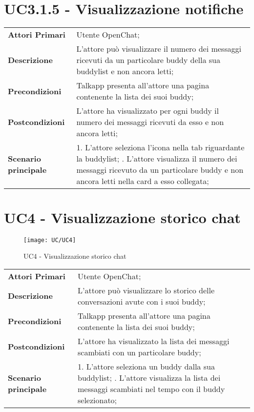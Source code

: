\section{UC3.1.5 - Visualizzazione notifiche}
	\begin{center}
		\bgroup
		\def\arraystretch{1.8}     
		\begin{longtable}{  p{4cm} | p{9.5cm} } 
			\textbf{Attori Primari} & Utente OpenChat; \\ 
			\textbf{Descrizione} &  L'attore può visualizzare il numero dei messaggi ricevuti da un particolare buddy della sua buddylist e non ancora letti; \\ 
			\textbf{Precondizioni}  & Talkapp presenta all'attore una pagina contenente la lista dei suoi buddy; \\
			\textbf{Postcondizioni} & L'attore ha visualizzato per ogni buddy il numero dei messaggi ricevuti da esso e non ancora letti;  \\ 
			\textbf{Scenario principale} & 
			1. L'attore seleziona l'icona nella tab riguardante la buddylist; \newline
			2. L'attore visualizza il numero dei messaggi ricevuto da un particolare buddy e non ancora letti nella card a esso collegata;
		\end{longtable}
		\egroup
	\end{center}


\section{UC4 - Visualizzazione storico chat}
	\begin{figure}[H] 
	\centering
	\texttt{[image: UC/UC4]}
	\caption{UC4 - Visualizzazione storico chat}
\end{figure}
	\begin{center}
	\bgroup
	\def\arraystretch{1.8}     
	\begin{longtable}{  p{4cm} | p{9.5cm} } 
		\textbf{Attori Primari} & Utente OpenChat; \\ 
		\textbf{Descrizione} &  L'attore può visualizzare lo storico delle conversazioni avute con i suoi buddy; \\ 
		\textbf{Precondizioni}  & Talkapp presenta all'attore una pagina contenente la lista dei suoi buddy; \\
		\textbf{Postcondizioni} & L'attore ha visualizzato la lista dei messaggi scambiati con un particolare buddy;  \\ 
		\textbf{Scenario principale} & 
		1. L'attore seleziona un buddy dalla sua buddylist; \newline
		2. L'attore visualizza la lista dei messaggi scambiati nel tempo con il buddy selezionato;
	\end{longtable}
	\egroup
\end{center}

